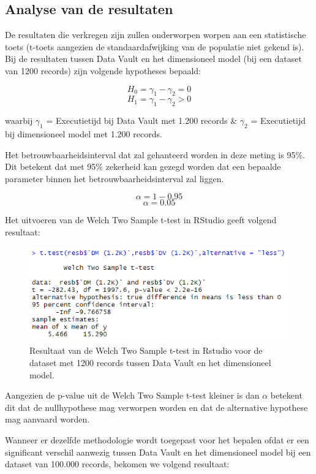 \subsection{Analyse van de resultaten}

De resultaten die verkregen zijn zullen onderworpen worpen aan een statistische toets (t-toets aangezien de standaardafwijking van de populatie niet gekend is). Bij de resultaten tussen Data Vault en het dimensioneel model (bij een dataset van 1200 records) zijn volgende hypotheses bepaald:

\[
H_0 = \gamma_1 - \gamma_2 = 0
\]
\[
H_1 = \gamma_1 - \gamma_2 > 0
\]

waarbij
$\gamma_1$ = Executietijd bij Data Vault met 1.200 records \&
$\gamma_2$ = Executietijd bij dimensioneel model met 1.200 records.

Het betrouwbaarheidsinterval dat zal gehanteerd worden in deze meting is 95\%. Dit betekent dat met 95\% zekerheid
kan gezegd worden dat een bepaalde parameter binnen het
betrouwbaarheidsinterval zal liggen.

\[
\alpha = 1 - 0.95
\]
\[
\alpha = 0.05
\]

Het uitvoeren van de Welch Two Sample t-test in RStudio geeft volgend resultaat:

\begin{figure}[h]
	\centering
	\includegraphics[scale=0.7]{../images/Ttest1200.png}
	\caption{Resultaat van de Welch Two Sample t-test in Rstudio voor de dataset met 1200 records tussen Data Vault en het dimensioneel model. }
	\label{fig:ttest1200}
\end{figure}

Aangezien de p-value uit de Welch Two Sample t-test kleiner is dan $\alpha$ betekent dit dat de nullhypothese mag verworpen worden en dat de alternative hypothese mag aanvaard worden.

Wanneer er dezelfde methodologie wordt toegepast voor het bepalen ofdat er een significant verschil aanwezig tussen Data Vault en het dimensioneel model bij een dataset van 100.000 records, bekomen we volgend resultaat:

